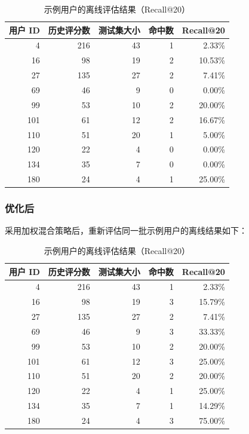 \begin{table}[htbp]
\centering
\begin{tabular}{r r r r r}
\hline
用户 ID & 历史评分数 & 测试集大小 & 命中数 & Recall@20 \\
\hline
4   & 216 & 43 & 1 & 2.33\% \\
16  & 98  & 19 & 2 & 10.53\% \\
27  & 135 & 27 & 2 & 7.41\% \\
69  & 46  & 9  & 0 & 0.00\% \\
99  & 53  & 10 & 2 & 20.00\% \\
101 & 61  & 12 & 2 & 16.67\% \\
110 & 51  & 20 & 1 & 5.00\% \\
120 & 22  & 4  & 0 & 0.00\% \\
134 & 35  & 7  & 0 & 0.00\% \\
180 & 24  & 4  & 1 & 25.00\% \\
\hline
\end{tabular}
\caption{示例用户的离线评估结果（Recall@20）}
\end{table}

\subsubsection{优化后}
采用加权混合策略后，重新评估同一批示例用户的离线结果如下：

\begin{table}[htbp]
\centering
\begin{tabular}{r r r r r}
\hline
用户 ID & 历史评分数 & 测试集大小 & 命中数 & Recall@20 \\
\hline
4   & 216 & 43 & 1 & 2.33\% \\
16  & 98  & 19 & 3 & 15.79\% \\
27  & 135 & 27 & 2 & 7.41\% \\
69  & 46  & 9  & 3 & 33.33\% \\
99  & 53  & 10 & 2 & 20.00\% \\
101 & 61  & 12 & 3 & 25.00\% \\
110 & 51  & 20 & 2 & 20.00\% \\
120 & 22  & 4  & 1 & 25.00\% \\
134 & 35  & 7  & 1 & 14.29\% \\
180 & 24  & 4  & 3 & 75.00\% \\
\hline
\end{tabular}
\caption{示例用户的离线评估结果（Recall@20）}
\end{table}

